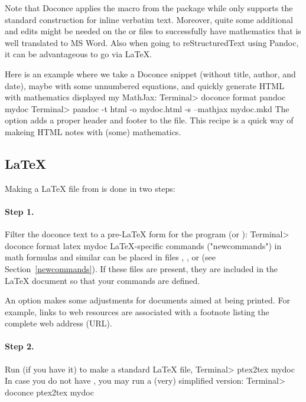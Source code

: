 \documentclass[%
oneside,                 %
final,                   %
chapterprefix=true,      %
open=right               %
10pt]{book}
\begin{document}
{{Note that Doconce applies the  macro from the  package
while  only supports the standard  construction for
inline verbatim text.  Moreover, quite some additional  and  edits might be needed on the  or
 files to successfully have mathematics that is well translated
to MS Word.  Also when going to reStructuredText using Pandoc, it can
be advantageous to go via {\LaTeX}.

Here is an example where we take a Doconce snippet (without title, author,
and date), maybe with some unnumbered equations, and quickly generate
HTML with mathematics displayed my MathJax:
\bsys
Terminal> doconce format pandoc mydoc
Terminal> pandoc -t html -o mydoc.html -s --mathjax mydoc.mkd
\esys
The  option adds a proper header and footer to the  file.
This recipe is a quick way of makeing HTML notes with (some) mathematics.

\subsection{{\LaTeX}}

Making a {\LaTeX} file  from  is done in two steps:

\paragraph{Step 1.}
Filter the doconce text to a pre-LaTeX form  for
the  program (or ):
\bsys
Terminal> doconce format latex mydoc
\esys
LaTeX-specific commands ("newcommands") in math formulas and similar
can be placed in files , , or
 (see Section~\ref{newcommands}).
If these files are present, they are included in the {\LaTeX} document
so that your commands are defined.

An option  makes some adjustments for documents
aimed at being printed. For example, links to web resources are
associated with a footnote listing the complete web address (URL).

\paragraph{Step 2.}
Run  (if you have it) to make a standard {\LaTeX} file,
\bsys
Terminal> ptex2tex mydoc
\esys
In case you do not have , you may run a (very) simplified version:
\bsys
Terminal> doconce ptex2tex mydoc
\esys

}}
\end{document}
